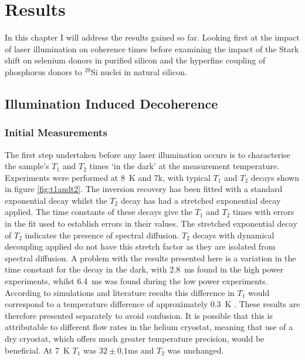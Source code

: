 \chapter{Results}

In this chapter I will address the results gained so far. Looking first at the impact of laser illumination on coherence times before examining the impact of the Stark shift on selenium donors in purified silicon and the hyperfine coupling of phosphorus donors to $^{29}$Si nuclei in natural silicon.

\section{Illumination Induced Decoherence}

\subsection{Initial Measurements}

The first step undertaken before any laser illumination occurs is to characterise the sample's $T_1$ and $T_2$ times `in the dark' at the measurement temperature. 
Experiments were performed at 8~K and 7k, with typical $T_1$ and $T_2$ decays shown in figure \ref{fig:t1andt2}.
The inversion recovery has been fitted with a standard exponential decay whilst the $T_2$ decay has had a stretched exponential decay applied.
The time constants of these decays give the $T_1$ and $T_2$ times with errors in the fit used to establish errors in their values.
The stretched exponential decay of $T_2$ indicates the presence of spectral diffusion.
$T_2$ decays with dynamical decoupling applied do not have this stretch factor as they are isolated from spectral diffusion.
A problem with the results presented here is a variation in the time constant for the decay in the dark, with 2.8~ms found in the high power experiments, whilst 6.4~ms was found during the low power experiments.
According to simulations and literature results this difference in $T_1$ would correspond to a temperature difference of approximately 0.3~K \cite{Tyryshkin2012}. 
These results are therefore presented separately to avoid confusion.
It is possible that this is attributable to different flow rates in the helium cryostat, meaning that use of a dry cryostat, which offers much greater temperature precision, would be beneficial. 
At 7~K $T_1$ was $32\pm0.1$ms and $T_2$ was unchanged.


